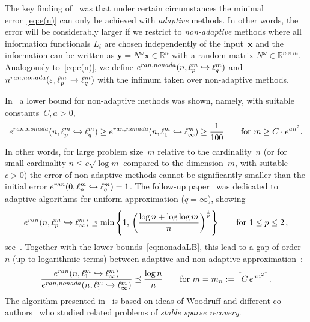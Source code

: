 \documentclass[12pt]{article}
\theoremstyle{plain}
\theoremstyle{definition}
\newcommand{\ran}{\textup{ran}}
\newcommand{\nonada}{\textup{nonada}}
\newcommand{\eps}{\varepsilon}
\newcommand{\embed}{\hookrightarrow}
\renewcommand{\vec}{\boldsymbol}
\newcommand{\R}{{\mathbb R}}
\begin{document}
The key finding of~\cite{KNW24,KW24b} was that under certain circumstances
the minimal error~\eqref{eq:e(n)} can only be achieved with \emph{adaptive} methods.
In other words, the error will be considerably larger if we restrict to \emph{non-adaptive} methods
where 
all information functionals $L_i$ are chosen independently of the input~$\vec{x}$ and
the information can be written as $\vec{y} = N^\omega \vec{x} \in \R^n$ with a random matrix \mbox{$N^\omega \in \R^{n \times m}$}.
Analogously to~\eqref{eq:e(n)},
we define $e^{\ran,\nonada}(n,\ell_p^m \embed \ell_q^m)$
and $n^{\ran,\nonada}(\eps,\ell_p^m \embed \ell_q^m)$
with the infimum taken over non-adaptive methods.

In~\cite[Thm~2.7]{KNW24} a lower bound for non-adaptive methods was shown, namely,
with suitable constants~$C,a > 0$,
\begin{equation} \label{eq:nonadaLB}
    e^{\ran,\nonada}(n,\ell_p^m \embed \ell_q^m)
        \geq e^{\ran,\nonada}(n,\ell_1^m \embed \ell_\infty^m)
        \geq \frac{1}{100}
    \qquad \text{for } m \geq C \cdot e^{a n^2}.
\end{equation}
In other words, for large problem size~$m$ relative to the cardinality~$n$
(or for small cardinality $n \leq c \sqrt{\log m}$ compared to the dimension~$m$, with suitable $c > 0$)
the error of non-adaptive methods
cannot be significantly smaller than the initial error
\mbox{$e^{\ran}(0,\ell_p^m \embed \ell_q^m) = 1$}.
The follow-up paper~\cite{KW24b} was dedicated to adaptive algorithms for uniform approximation ($q=\infty$),
showing
\begin{equation} \label{eq:uniformUB}
    e^{\ran}(n,\ell_p^m \embed \ell_\infty^m)
        \preceq \min\left\{1,\, \left(\frac{\log n + \log \log m}{n}\right)^{\frac{1}{p}} \right\} 
    \qquad\text{for } 1 \leq p \leq 2 \,,
\end{equation}
see~\cite[Thm~3.3]{KW24b}. Together with the lower bounds~\eqref{eq:nonadaLB},
this lead to a gap of order~$n$ (up to logarithmic terms) between adaptive and non-adaptive approximation~\cite[Thm~4.1]{KW24b}:
\begin{equation} \label{eq:gap1oo}
    \frac{e^{\ran}(n,\ell_1^m \embed \ell_\infty^m)
        }{e^{\ran,\nonada}(n,\ell_1^m \embed \ell_\infty^m)}
        \preceq \frac{\log n}{n}
    \qquad\text{for $m = m_n := \left\lceil C\, e^{an^2} \right\rceil$.}
\end{equation}
The algorithm presented in~\cite{KW24b} is based on ideas of Woodruff and different co-authors~\cite{IPW11,LNW17,LNW18} who studied related problems of \emph{stable sparse recovery}.
\end{document}
